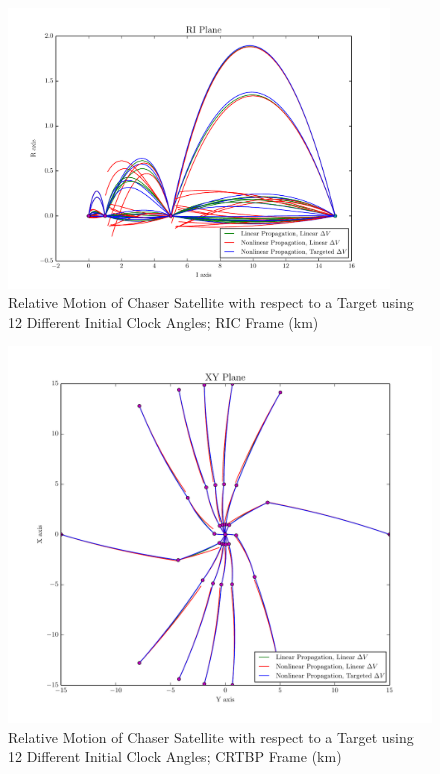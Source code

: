 \documentclass[a4paper]{article}
\begin{document}
\begin{figure}[h] 
	\begin{center}
		\includegraphics[width=0.9\textwidth]{RIC_2} %
		\caption{Relative Motion of Chaser Satellite with respect to a Target using 12 Different Initial Clock Angles; RIC Frame (km)}
		\label{fig:RIC_2}
	\end{center}
\end{figure}

\begin{figure}[h] 
	\begin{center}
		\includegraphics[scale=0.5]{RLP_2} %
		\caption{Relative Motion of Chaser Satellite with respect to a Target using 12 Different Initial Clock Angles; CRTBP Frame (km)}
		\label{fig:RLP_2}
	\end{center}
\end{figure}
\end{document}
